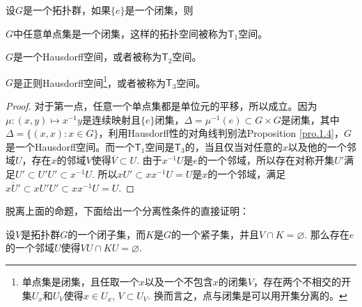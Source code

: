 

\begin{pro}\label{pro:3}
设$G$是一个拓扑群，如果$\{e\}$是一个闭集，则

\begin{compactenum}
\item $G$中任意单点集是一个闭集，这样的拓扑空间被称为$\mathsf{T}_1$空间。

\item $G$是一个Hausdorff空间，或者被称为$\mathsf{T}_2$空间。

\item $G$是正则Hausdorff空间\footnote{单点集是闭集，且任取一个$x$以及一个不包含$x$的闭集$V$，存在两个不相交的开集$U_x$和$U_V$使得$x\in U_x$, $V\subset U_V$. 换而言之，点与闭集是可以用开集分离的。}，或者被称为$\mathsf{T}_3$空间。
\end{compactenum}
\end{pro}

\begin{proof}
	对于第一点，任意一个单点集都是单位元的平移，所以成立。因为$\mu:(x,y)\mapsto x^{-1}y$是连续映射且$\{e\}$闭集，$\Delta=\mu^{-1}(e)\subset G\times G$是闭集，其中$\Delta=\{(x,x):x\in G\}$，利用Hausdorff性的对角线判别法Proposition \ref{pro.1.4}，$G$是一个Hausdorff空间。而一个$\mathsf{T}_1$空间是$\mathsf{T}_3$的，当且仅当对任意的$x$以及他的一个邻域$U$，存在$x$的邻域$V$使得$\overline{V}\subset U$. 由于$x^{-1}U$是$e$的一个邻域，所以存在对称开集$U'$满足$U'\subset U'U'\subset x^{-1}U$. 所以$xU'\subset xx^{-1}U=U$是$x$的一个邻域，满足$\overline{xU'}\subset xU'U'\subset xx^{-1}U=U$.
\end{proof}

脱离上面的命题，下面给出一个分离性条件的直接证明：

\begin{pro}\label{1.16}
设$V$是拓扑群$G$的一个闭子集，而$K$是$G$的一个紧子集，并且$V\cap K=\varnothing$. 那么存在$e$的一个邻域$U$使得$VU\cap KU=\varnothing$.
\end{pro}

